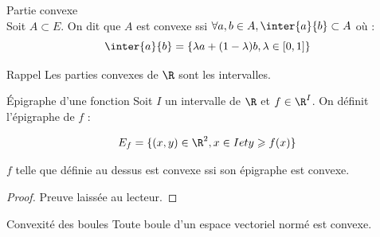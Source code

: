 \begin{definition}{Partie convexe}{}
    \\Soit $A \subset E$. 
    On dit que $A$ est convexe ssi $\forall a, b \in A, \inter{a}{b} \subset A$ où :
    $$\inter{a}{b} = \{\lambda a + (1 - \lambda)b, \lambda \in [0, 1]\}$$
\end{definition}

\begin{theoreme}{Rappel}{}
    Les parties convexes de $\R$ sont les intervalles.
\end{theoreme}


\begin{definition}{Épigraphe d'une fonction}{}
    Soit $I$ un intervalle de $\R$ et $f \in \R^{I}$.
    On définit l'épigraphe de $f$ :

    \[ E_f = \{(x,y) \in \R^2, x \in I et y \geqslant f(x)\}\]     
\end{definition}

\begin{proposition}{}{}
    $f$ telle que définie au dessus est convexe ssi son épigraphe est convexe.
\end{proposition}

\begin{proof}
    Preuve laissée au lecteur.
\end{proof}

\begin{proposition}{Convexité des boules}{}
    Toute boule d'un espace vectoriel normé est convexe. 
\end{proposition}



